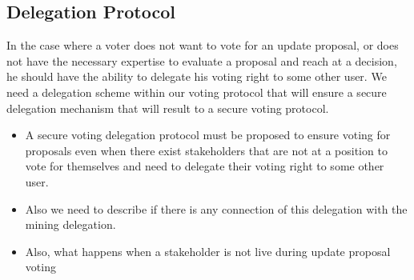 \subsection*{Delegation Protocol}
In the case where a voter does not want to vote for an update proposal, or does not have the necessary expertise to evaluate a proposal and reach at a decision, he should have the ability to delegate his voting right to some other user. We need a delegation scheme within our voting protocol that will ensure a secure delegation mechanism that will result to a secure voting protocol.  
\begin{itemize}
\item A secure voting delegation protocol must be proposed to ensure voting for proposals even when there exist stakeholders that are not at a position to vote for themselves and need to delegate their voting right to some other user. 
\item Also we need to describe if there is any connection of this delegation with the mining delegation.
\item Also, what happens when a stakeholder is not live during update proposal voting
\end{itemize}

